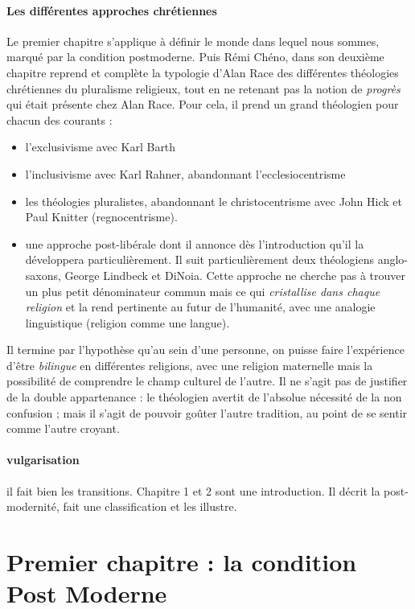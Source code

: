 \paragraph{Les différentes approches chrétiennes} Le premier chapitre s'applique à définir le monde dans lequel nous sommes, marqué par la condition postmoderne. Puis Rémi Chéno, dans son deuxième chapitre reprend et complète la typologie d'Alan Race des différentes théologies chrétiennes du pluralisme religieux, tout en ne retenant pas la notion de \textit{progrès} qui était présente chez Alan Race. Pour cela, il prend un grand théologien pour chacun des courants : 
\begin{itemize}
    \item l'exclusivisme avec Karl Barth
    \item l'inclusivisme avec Karl Rahner, abandonnant l'ecclesiocentrisme
    \item les théologies pluralistes, abandonnant le christocentrisme avec John Hick et Paul Knitter (regnocentrisme). 
    \item une approche post-libérale dont il annonce dès l'introduction qu'il la développera particulièrement. Il suit particulièrement deux théologiens anglo-saxons,  George Lindbeck   et DiNoia. Cette approche ne cherche pas à trouver un plus petit dénominateur commun mais ce qui \textit{cristallise dans chaque religion} et la rend pertinente au futur de l'humanité, avec une analogie linguistique (religion comme une langue). 
\end{itemize}
Il termine par l'hypothèse qu'au sein d'une personne, on puisse faire l'expérience d'être \textit{bilingue} en différentes religions, avec une religion maternelle mais la possibilité de comprendre le champ culturel de l'autre.  Il ne s’agit pas de justifier de la double
appartenance : le théologien avertit de l’absolue nécessité de la non confusion ;
mais il s’agit de pouvoir goûter l’autre tradition, au point de se sentir comme
l’autre croyant. 

\paragraph{vulgarisation} il fait bien les transitions. Chapitre 1 et 2 sont une introduction. Il décrit la post-modernité, fait une classification et les illustre.

\section{Premier chapitre : la condition Post Moderne}

